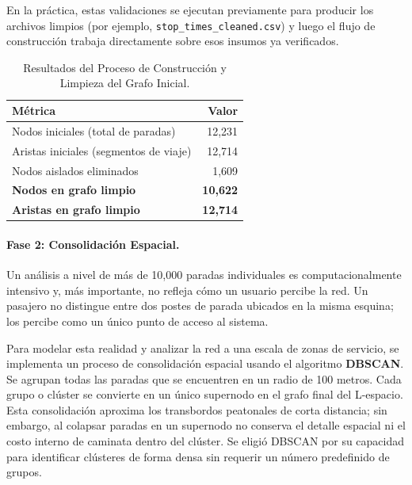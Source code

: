             En la práctica, estas validaciones se ejecutan previamente para producir los archivos limpios (por ejemplo, \texttt{stop\_times\_cleaned.csv}) y luego el flujo de construcción trabaja directamente sobre esos insumos ya verificados.

            \begin{table}[H]
                \centering
                \caption{Resultados del Proceso de Construcción y Limpieza del Grafo Inicial.}
                \label{tab:construccion_grafo}
                \begin{tabular}{lr}
                    \hline
                    \textbf{Métrica} & \textbf{Valor} \\
                    \hline
                    Nodos iniciales (total de paradas) & 12,231 \\
                    Aristas iniciales (segmentos de viaje) & 12,714 \\
                    Nodos aislados eliminados & 1,609 \\
                    \hline
                    \textbf{Nodos en grafo limpio} & \textbf{10,622} \\
                    \textbf{Aristas en grafo limpio} & \textbf{12,714} \\
                    \hline
                \end{tabular}
            \end{table}

            \paragraph{Fase 2: Consolidación Espacial.}
            Un análisis a nivel de más de 10,000 paradas individuales es computacionalmente intensivo y, más importante, no refleja cómo un usuario percibe la red. Un pasajero no distingue entre dos postes de parada ubicados en la misma esquina; los percibe como un único punto de acceso al sistema.

            Para modelar esta realidad y analizar la red a una escala de zonas de servicio, se implementa un proceso de consolidación espacial usando el algoritmo \textbf{DBSCAN}. Se agrupan todas las paradas que se encuentren en un radio de 100 metros. Cada grupo o clúster se convierte en un único supernodo en el grafo final del L-espacio. Esta consolidación aproxima los transbordos peatonales de corta distancia; sin embargo, al colapsar paradas en un supernodo no conserva el detalle espacial ni el costo interno de caminata dentro del clúster. Se eligió DBSCAN por su capacidad para identificar clústeres de forma densa sin requerir un número predefinido de grupos.

